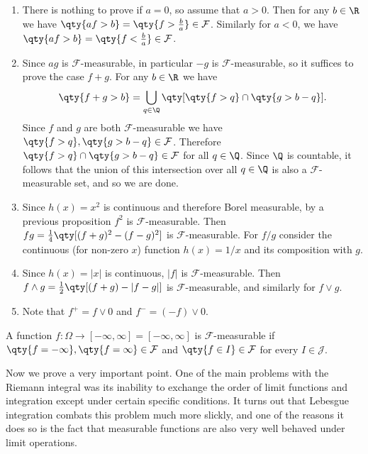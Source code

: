 \documentclass{maths}
\newcommand{\alg}{\mathcal{F}}
\newcommand{\intvl}{\mathcal{J}}
\begin{document}
\begin{prf}
    \begin{enumerate}
        \item There is nothing to prove if $a=0$, so assume that $a>0$.
        Then for any $b\in\R$ we have $\qty{af>b}=\qty{f>\frac{b}{a}}\in\alg$.
        Similarly for $a<0$, we have $\qty{af>b}=\qty{f<\frac{b}{a}}\in\alg$.
        \item Since $ag$ is $\alg$-measurable, in particular $-g$ is $\alg$-measurable, so it suffices to prove the case $f+g$.
        For any $b\in\R$ we have
        \[
            \qty{f + g > b} =
            \bigcup_{q\in\Q} \qty[\qty{f > q} \cap \qty{g > b - q}].
        \]
        Since $f$ and $g$ are both $\alg$-measurable we have $\qty{f > q}, \qty{g > b - q}\in\alg$.
        Therefore $\qty{f > q} \cap \qty{g > b - q}\in\alg$ for all $q\in\Q$.
        Since $\Q$ is countable, it follows that the union of this intersection over all $q\in\Q$ is also a $\alg$-measurable set, and so we are done.
        \item Since $h(x)=x^2$ is continuous and therefore Borel measurable, by a previous proposition $f^2$ is $\alg$-measurable.
        Then $fg = \frac{1}{4}\qty[(f + g)^2 - (f - g)^2]$ is $\alg$-measurable.
        For $f/g$ consider the continuous (for non-zero $x$) function $h(x)=1/x$ and its composition with $g$.
        \item Since $h(x)=|x|$ is continuous, $|f|$ is $\alg$-measurable.
        Then $f\wedge g = \frac{1}{2}\qty[(f + g) - |f - g|]$ is $\alg$-measurable, and similarly for $f\vee g$.
        \item Note that $f^+=f\vee0$ and $f^-=(-f)\vee0$.
    \end{enumerate}
\end{prf}

\begin{defn}
    A function $f\colon\Omega\to[-\infty,\infty] = [-\infty,\infty]$ is $\alg$-measurable if $\qty{f=-\infty},\qty{f=\infty}\in\alg$ and $\qty{f\in I}\in\alg$ for every $I\in\intvl$.
\end{defn}

Now we prove a very important point.
One of the main problems with the Riemann integral was its inability to exchange the order of limit functions and integration except under certain specific conditions.
It turns out that Lebesgue integration combats this problem much more slickly, and one of the reasons it does so is the fact that measurable functions are also very well behaved under limit operations.
\end{document}
